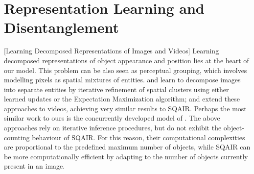 	


\section{Representation Learning and Disentanglement}
\label{sec:repr_learning}


		[Learning Decomposed Representations of Images and Videos]
	Learning decomposed representations of object appearance and position lies at the heart of our model.
	This problem can be also seen as perceptual grouping, which involves modelling pixels as spatial mixtures of entities.
	\cite{Greff2016tagger} and \cite{Greff2017neuralem} learn to decompose images into separate entities by iterative refinement of spatial clusters using either learned updates or the Expectation Maximization algorithm;
	\cite{Ilin2017recurrentln} and \cite{Steenkiste2018} extend these approaches to videos, achieving very similar results to \gls{SQAIR}.
	Perhaps the most similar work to ours is the concurrently developed model of \cite{Hsieh2018ddpae}.
	The above approaches rely on iterative inference procedures, but do not exhibit the object-counting behaviour of \gls{SQAIR}.
	For this reason, their computational complexities are proportional to the predefined maximum number of objects, while \gls{SQAIR} can be more computationally efficient by adapting to the number of objects currently present in an image.
	

